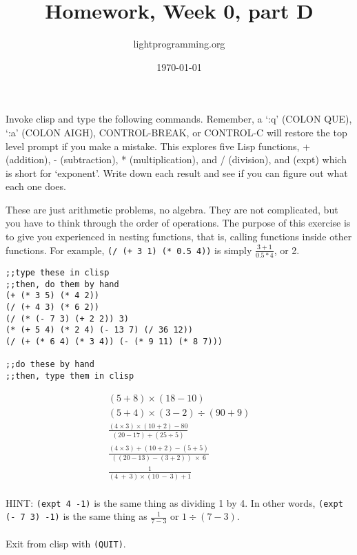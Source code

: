 \documentclass{article}
\title{Homework, Week 0, part D}
\author{lightprogramming.org}
\date{\today}
\begin{document}
\maketitle{}
\lstset{language=Lisp}

Invoke clisp and type the following commands. Remember, a `:q' (COLON QUE), `:a' (COLON AIGH), CONTROL-BREAK, or CONTROL-C will restore the top level prompt if you make a mistake. This explores five Lisp functions, + (addition), - (subtraction), * (multiplication), and / (division), and (expt) which is short for `exponent'. Write down each result and see if you can figure out what each one does.

These are just arithmetic problems, no algebra. They are not complicated, but you have to think through the order of operations. The purpose of this exercise is to give you experienced in nesting functions, that is, calling functions inside other functions. For example, \texttt{(/ (+ 3 1) (* 0.5 4))} is simply $\frac{3 + 1}{0.5 * 4}$, or 2.

\begin{lstlisting}
;;type these in clisp
;;then, do them by hand
(+ (* 3 5) (* 4 2))
(/ (+ 4 3) (* 6 2))
(/ (* (- 7 3) (+ 2 2)) 3)
(* (+ 5 4) (* 2 4) (- 13 7) (/ 36 12))
(/ (+ (* 6 4) (* 3 4)) (- (* 9 11) (* 8 7)))

;;do these by hand
;;then, type them in clisp
\end{lstlisting}

\begin{gather*}
(5 + 8) \times (18 - 10) \\
(5 + 4) \times (3 - 2) \div (90 + 9)\\
\frac{(4 \times 3) \times (10 + 2) - 80}{(20 - 17) + (25 \div 5)} \\
\frac{(4 \times 3) + (10 + 2) - (5 + 5)}{((20 - 13) - (3 + 2)) \: \times \: 6} \\
\frac{1}{( 4 \: + \: 3) \times (10 \:- \:    3) + 1} \\
\end{gather*}


HINT: \texttt{(expt 4 -1)} is the same thing as dividing 1 by 4. In other words, \texttt{(expt (- 7 3) -1)} is the same thing as $\frac{1}{7 - 3}$ or $1 \div (7 - 3)$. \\


\paragraph{}Exit from clisp with \texttt{(QUIT)}.
\end{document}
